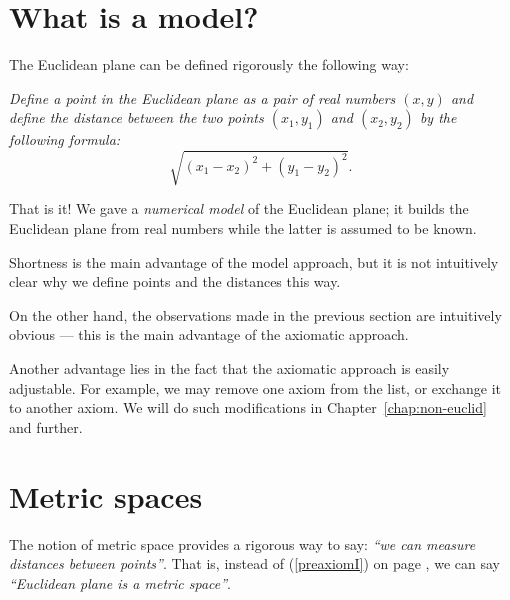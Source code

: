 \section*{What is a model?}
\label{page:model}

The Euclidean plane can be defined rigorously the following way:

{}\emph{Define a {}\emph{point} in the Euclidean plane as a pair of real numbers $(x,y)$ and define the {}\emph{distance} between the two points $(x_1,y_1)$ and $(x_2,y_2)$ by the following formula:}
\[\sqrt{(x_1-x_2)^2+(y_1-y_2)^2}.\]

That is it!
We gave a {}\emph{numerical model} of the Euclidean plane;
it builds the Euclidean plane from real numbers
while the latter is assumed to be known.

Shortness is the main advantage of the model approach,
but it is not intuitively clear why we define points and the distances this way.

On the other hand, the observations made in the previous section are intuitively obvious ---
this is the main advantage of the axiomatic approach.

Another advantage lies in the fact that the axiomatic approach is easily adjustable. 
For example, we may remove one axiom from the list,
or exchange it to another axiom. 
We will do such modifications in Chapter~\ref{chap:non-euclid} and further.

\section*{Metric spaces}

The notion of metric space provides 
a rigorous way to say: {}\emph{``we can measure distances between points''}.
That is, instead of (\ref{preaxiomI}) on page \pageref{preaxiomI},
we can say {}\emph{``Euclidean plane is a metric space''}.

